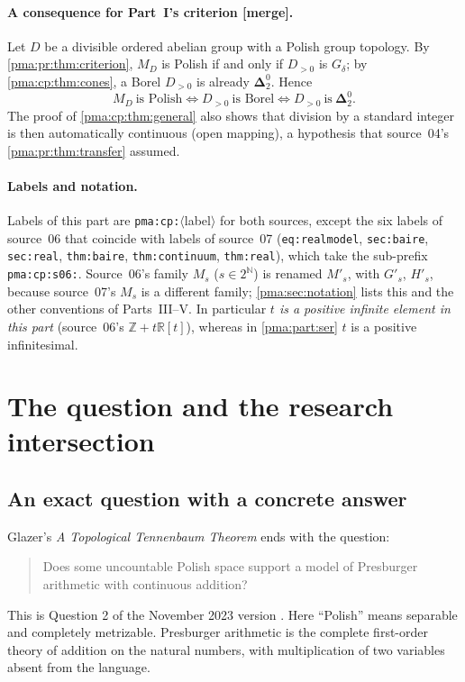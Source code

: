 \documentclass[11pt]{article}
\numberwithin{equation}{section}
\theoremstyle{definition}
\theoremstyle{remark}
\newcommand{\N}{\mathbb N}
\newcommand{\Z}{\mathbb Z}
\newcommand{\R}{\mathbb R}
\newcommand{\MD}{M_D}
\newcommand{\Dtwo}{\boldsymbol{\Delta}^{0}_{2}}
\newcommand{\mergetag}{\textup{\textsf{\small[merge]}}}
\begin{document}
\paragraph{A consequence for Part~I's criterion \mergetag.} Let $D$ be a
divisible ordered abelian group with a Polish group topology. By
\cref{pma:pr:thm:criterion}, $\MD$ is Polish if and only if $D_{>0}$ is
$G_\delta$; by \cref{pma:cp:thm:cones}, a Borel $D_{>0}$ is already $\Dtwo$.
Hence
\[
 \MD\ \text{is Polish}\iff D_{>0}\ \text{is Borel}\iff D_{>0}\ \text{is}\ \Dtwo .
\]
The proof of \cref{pma:cp:thm:general} also shows that division by a standard
integer is then automatically continuous (open mapping), a hypothesis that
source~04's \cref{pma:pr:thm:transfer} assumed.

\paragraph{Labels and notation.} Labels of this part are
\texttt{pma:cp:}$\langle$label$\rangle$ for both sources, except the six
labels of source~06 that coincide with labels of source~07
(\texttt{eq:realmodel}, \texttt{sec:baire}, \texttt{sec:real},
\texttt{thm:baire}, \texttt{thm:continuum}, \texttt{thm:real}), which take
the sub-prefix \texttt{pma:cp:s06:}. Source~06's family $M_s$ ($s\in2^{\N}$)
is renamed $M'_s$, with $G'_s$, $H'_s$, because source~07's $M_s$ is a
different family; \cref{pma:sec:notation} lists this and the other
conventions of Parts~III--V. In particular \emph{$t$ is a positive infinite
element in this part} (source~06's $\Z+t\R[t]$), whereas in \cref{pma:part:ser}
$t$ is a positive infinitesimal.

\section{The question and the research intersection}
\label{pma:cp:sec:introduction}

\subsection{An exact question with a concrete answer}

Glazer's \emph{A Topological Tennenbaum Theorem} ends with the question:
\begin{quote}
Does some uncountable Polish space support a model of Presburger arithmetic
with continuous addition?
\end{quote}
This is Question 2 of the November 2023 version \cite{Glazer}.
Here ``Polish'' means separable and completely metrizable. Presburger
arithmetic is the complete first-order theory of addition on the natural
numbers, with multiplication of two variables absent from the language.
\end{document}

